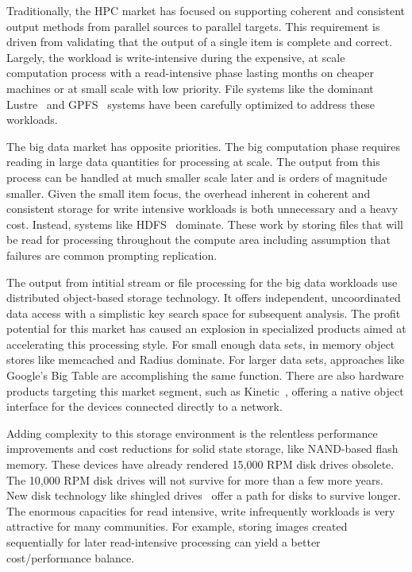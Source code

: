 Traditionally, the HPC market has focused on supporting coherent and consistent
output methods from parallel sources to parallel targets. This requirement is
driven from validating that the output of a single item is complete and
correct. Largely, the workload is write-intensive during the expensive, at
scale computation process with a read-intensive phase lasting months on cheaper
machines or at small scale with low priority. File systems like the dominant
Lustre~\cite{braam:2002:lustre-arch} and GPFS~\cite{schmuck:2002:gpfs} systems have been carefully optimized
to address these workloads.

The big data market has opposite priorities. The big computation phase requires
reading in large data quantities for processing at scale. The output from this
process can be handled at much smaller scale later and is orders of magnitude
smaller. Given the small item focus, the overhead inherent in coherent and
consistent storage for write intensive workloads is both unnecessary and a
heavy cost. Instead, systems like HDFS~\cite{shvachko:2010:hdfs} dominate.
These work by storing files that will be read for processing throughout the
compute area including assumption that failures are common prompting
replication.

The output from intitial stream or file processing for the big data workloads
use distributed object-based storage technology. It offers independent,
uncoordinated data access with a simplistic key search space for subsequent
analysis. The profit potential for this market has caused an explosion in
specialized products aimed at accelerating this processing style.  For small
enough data sets, in memory object stores like memcached and Radius dominate.
For larger data sets, approaches like Google's Big Table are accomplishing the
same function. There are also hardware products targeting this market segment,
such as Kinetic~\cite{segate-kinetic}, offering a native object interface for
the devices connected directly to a network.

Adding complexity to this storage environment is the relentless performance
improvements and cost reductions for solid state storage, like NAND-based flash
memory. These devices have already rendered 15,000 RPM disk drives obsolete.
The 10,000 RPM disk drives will not survive for more than a few more years.
New disk technology like shingled drives~\cite{wood:2009:shingled-media} offer
a path for disks to survive longer. The enormous capacities for read intensive,
write infrequently workloads is very attractive for many communities. For
example, storing images created sequentially for later read-intensive
processing can yield a better cost/performance balance.

